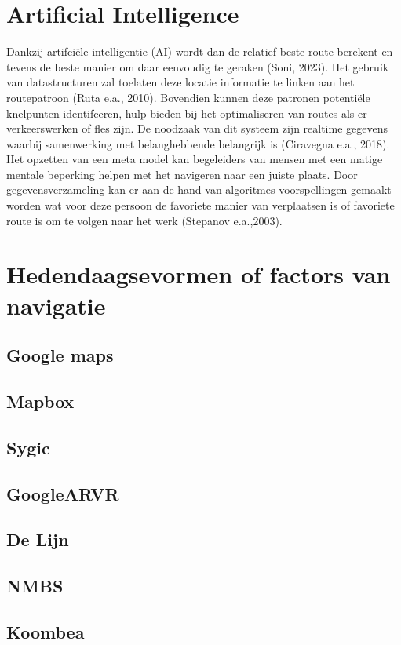 \section{Artificial Intelligence}
\label{sec:artificial intelligence}
Dankzij artifciële intelligentie (AI) wordt dan de relatief beste route berekent en tevens de beste manier om daar eenvoudig te geraken (Soni, 2023). Het gebruik van datastructuren zal toelaten deze locatie informatie te linken aan het routepatroon (Ruta e.a., 2010). Bovendien kunnen deze patronen potentiële knelpunten identifceren, hulp bieden bij het optimaliseren van routes als er verkeerswerken of fles zijn. De noodzaak van dit systeem zijn realtime gegevens waarbij samenwerking met belanghebbende belangrijk is (Ciravegna e.a., 2018). Het opzetten van een meta model kan begeleiders van mensen met een matige mentale beperking helpen met het navigeren naar een juiste plaats. Door gegevensverzameling kan er aan de hand van algoritmes voorspellingen gemaakt worden wat voor deze persoon de favoriete manier van verplaatsen is of favoriete route is om te volgen naar het werk (Stepanov e.a.,2003).
\section{Hedendaagsevormen of factors van navigatie}
\label{sec:literatuuroverzicht}
\subsection{Google maps}
\label{sec:google maps}
\subsection{Mapbox}
\label{sec:mapbox}
\subsection{Sygic}
\label{sec:sygic}
\subsection{GoogleARVR}
\label{sec:googlearvr}
\subsection{De Lijn}
\label{sec:delijn}
\subsection{NMBS}
\label{sec:nmbs}
\subsection{Koombea}
\label{sec:koombea}
